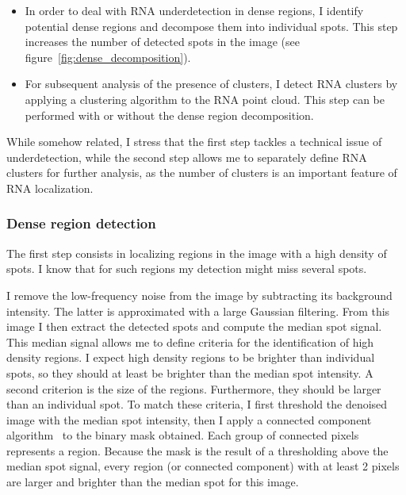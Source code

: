 \begin{itemize}
	\setlength\itemsep{0.1em}
	\item In order to deal with \ac{RNA} underdetection in dense regions, I identify potential dense regions and decompose them into individual spots.
	This step increases the number of detected spots in the image (see figure~\ref{fig:dense_decomposition}).
	\item For subsequent analysis of the presence of clusters, I detect \ac{RNA} clusters by applying a clustering algorithm to the \ac{RNA} point cloud.
	This step can be performed with or without the dense region decomposition.
\end{itemize}

While somehow related, I stress that the first step tackles a technical issue of underdetection, while the second step allows me to separately define \ac{RNA} clusters for further analysis, as the number of clusters is an important feature of \ac{RNA} localization.

\subsubsection{Dense region detection}

The first step consists in localizing regions in the image with a high density of spots.
I know that for such regions my detection might miss several spots.

I remove the low-frequency noise from the image by subtracting its background intensity.
The latter is approximated with a large Gaussian filtering.
From this image I then extract the detected spots and compute the median spot signal.
This median signal allows me to define criteria for the identification of high density regions.
I expect high density regions to be brighter than individual spots, so they should at least be brighter than the median spot intensity.
A second criterion is the size of the regions.
Furthermore, they should be larger than an individual spot.
To match these criteria, I first threshold the denoised image with the median spot intensity, then I apply a connected component algorithm~\cite{wu_connected_component_2005} to the binary mask obtained.
Each group of connected pixels represents a region.
Because the mask is the result of a thresholding above the median spot signal, every region (or connected component) with at least 2 pixels are larger and brighter than the median spot for this image.

